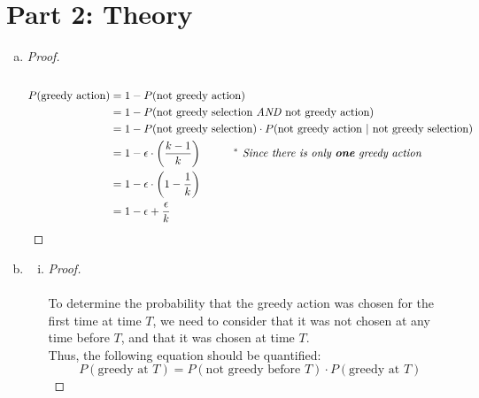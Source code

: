 \documentclass{article}
\newcommand\ddfrac[2]{\frac{\displaystyle #1}{\displaystyle #2}}
\begin{document}
\section*{Part 2: Theory}
\begin{enumerate}[a)]
    \item \begin{proof}
        \renewcommand{\qedsymbol}{$\blacksquare$}
        \hfill\\\\
        \begin{equation*}
            \begin{aligned}
                P(\text{greedy action}) &= 1 - P(\text{not greedy action})\\
                &= 1 - P(\text{not greedy selection \textit{AND} not greedy action})\\
                &= 1 - P(\text{not greedy selection}) \cdot P(\text{not greedy action $|$ not greedy selection})\\
                &= 1 - \epsilon \cdot \left(\ddfrac{k-1}{k}\right) \textit{\hspace{1cm}$^{*}$ Since there is only \textbf{one} greedy action}\\
                &= 1 - \epsilon \cdot \left(1-\ddfrac{1}{k}\right)\\
                &= 1 - \epsilon + \ddfrac{\epsilon}{k}\\
            \end{aligned}
        \end{equation*}
    \end{proof}
    \item  
    \begin{enumerate}[i)]
        \item \begin{proof}
            \renewcommand{\qedsymbol}{$\blacksquare$}
            \hfill\\\\
            To determine the probability that the greedy action was chosen for the first time at time $T$, we need to consider that it was not chosen at any time before $T$, and that it was chosen at time $T$.\\
            Thus, the following equation should be quantified:
            \begin{equation*}
                P(\text{greedy at } T) = P(\text{not greedy before } T) \cdot P(\text{greedy at } T)
            \end{equation*}

\end{proof}
\end{enumerate}
\end{enumerate}
\end{document}
